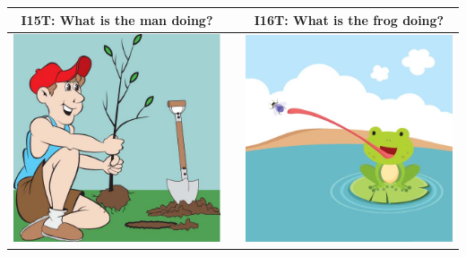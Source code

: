 \documentclass[12pt,notitlepage]{article}
\begin{document}
\begin{center}
\begin{tabular}{|c|c|c|}
\hline
I15T: What is the man doing? && I16T: What is the frog doing? \\
\hline
\includegraphics[width=20em,trim=0 0 0 -3]{figures/I15.jpg} & & \includegraphics[width=20em,trim=0 0 0 -3]{figures/I16.jpg} \\
\hline
\end{tabular}
\vspace{1em} \\



\end{center}
\end{document}
